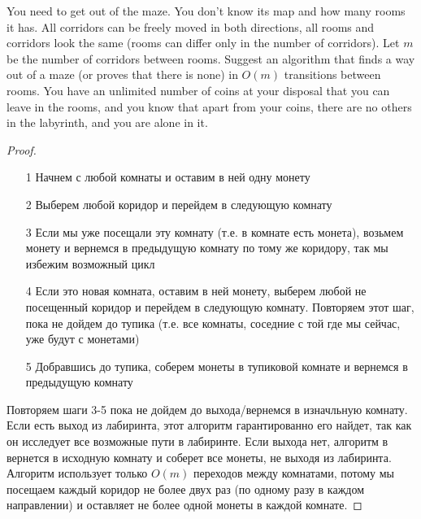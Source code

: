 \begin{prob}
You need to get out of the maze. You don't know its map and how many rooms it has. All corridors can be freely moved in both directions, all rooms and corridors look the same (rooms can differ only in the number of corridors). Let $m$ be the number of corridors between rooms. Suggest an algorithm that finds a way out of a maze (or proves that there is none) in $O(m)$ transitions between rooms. You have an unlimited number of coins at your disposal that you can leave in the rooms, and you know that apart from your coins, there are no others in the labyrinth, and you are alone in it.
\end{prob}
\vskip 0.2in
\begin{proof}
\begin{itemize}
\item[]
\item[1] Начнем с любой комнаты и оставим в ней одну монету
\item[2] Выберем любой коридор и перейдем в следующую комнату
\item[3] Если мы уже посещали эту комнату (т.е. в комнате есть монета), возьмем монету и вернемся в предыдущую комнату по тому же коридору, так мы избежим возможный цикл
\item[4] Если это новая комната, оставим в ней монету, выберем любой не посещенный коридор и перейдем в следующую комнату. Повторяем этот шаг, пока не дойдем до тупика (т.е. все комнаты, соседние с той где мы сейчас, уже будут с монетами)
\item[5] Добравшись до тупика, соберем монеты в тупиковой комнате и вернемся в предыдущую комнату
\end{itemize}
Повторяем шаги 3-5 пока не дойдем до выхода/вернемся в изначльную комнату.
\vskip 0.1in
Если есть выход из лабиринта, этот алгоритм гарантированно его найдет, так как он исследует все возможные пути в лабиринте. Если выхода нет, алгоритм в вернется в исходную комнату и соберет все монеты, не выходя из лабиринта.
\vskip 0.1in
Алгоритм использует только $O(m)$ переходов между комнатами, потому мы посещаем каждый коридор не более двух раз (по одному разу в каждом направлении) и оставляет не более одной монеты в каждой комнате.
\end{proof}
\vskip 0.6in

